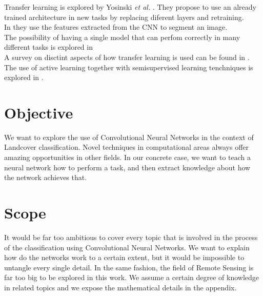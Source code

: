 Transfer learning is explored by Yosinski \textit{et al.} \cite{DBLP:journals/corr/YosinskiCBL14}. They propose to use an already trained architecture in new tasks by replacing diferent layers and retraining.\\

In \cite{DBLP:journals/corr/LongSD14} they use the features extracted from the CNN to segment an image.\\

The possibility of having a single model that can perfom correctly in many different tasks is explored in \cite{DBLP:journals/corr/KaiserGSVPJU17}\\

A survey on disctint aspects of how transfer learning is used can be found in \cite{5288526}.\\

The use of active learning together with semisupervised learning tenchniques is explored in \cite{7956153}.\\


\section{Objective}

We want to explore the use of Convolutional Neural Networks in the context of Landcover classification. Novel techniques in computational areas always offer amazing opportunities in other fields. In our concrete case, we want to teach a neural network how to perform a task, and then extract knowledge about how the network achieves that.\\

\section{Scope}

It would be far too ambitious to cover every topic that is involved in the process of the classification using Convolutional Neural Networks. We want to explain how do the networks work to a certain extent, but it would be impossible to untangle every single detail. In the same fashion, the field of Remote Sensing is far too big to be explored in this work. We assume a certain degree of knowledge in related topics and we expose the mathematical details in the appendix.\\
